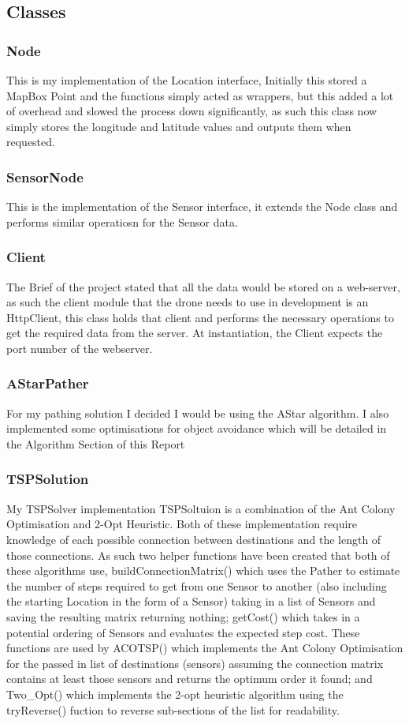 \documentclass[12pt]{article}
\begin{document}
\subsection{Classes}
\subsubsection{Node}
This is my implementation of the Location interface, Initially this stored a MapBox Point and the functions simply acted as wrappers, but this added a lot of overhead and slowed the process down significantly, as such this class now simply stores the longitude and latitude values and outputs them when requested.
\subsubsection{SensorNode}
This is the implementation of the Sensor interface, it extends the Node class and performs similar operatiosn for the Sensor data.
\subsubsection{Client}
The Brief of the project stated that all the data would be stored on a web-server, as such the client module that the drone needs to use in development is an HttpClient, this class holds that client and performs the necessary operations to get the required data from the server. At instantiation, the Client expects the port number of the webserver.
\subsubsection{AStarPather}
For my pathing solution I decided I would be using the AStar algorithm. I also implemented some optimisations for object avoidance which will be detailed in the Algorithm Section of this Report
\subsubsection{TSPSolution}
My TSPSolver implementation TSPSoltuion is a combination of the Ant Colony Optimisation and 2-Opt Heuristic. Both of these implementation require knowledge of each possible connection between destinations and the length of those connections. As such two helper functions have been created that both of these algorithms use, buildConnectionMatrix() which uses the Pather to estimate the number of steps required to get from one Sensor to another (also including the starting Location in the form of a Sensor) taking in a list of Sensors and saving the resulting matrix returning nothing; getCost() which takes in a potential ordering of Sensors and evaluates the expected step cost. \newline
These functions are used by ACOTSP() which implements the Ant Colony Optimisation for the passed in list of destinations (sensors) assuming the connection matrix contains at least those sensors and returns the optimum order it found; and Two\_Opt() which implements the 2-opt heuristic algorithm using the tryReverse() fuction to reverse sub-sections of the list for readability.
\end{document}
